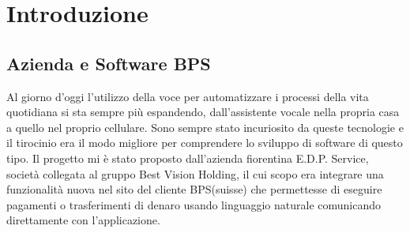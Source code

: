 \chapter{Introduzione}
\section{Azienda e Software BPS}
Al giorno d'oggi l'utilizzo della voce per automatizzare i processi della vita quotidiana si sta sempre più espandendo, dall'assistente vocale nella propria casa a quello nel proprio cellulare. Sono sempre stato incuriosito da queste tecnologie e il tirocinio era il modo migliore per comprendere lo sviluppo di software di questo tipo. Il progetto mi è stato proposto dall'azienda fiorentina E.D.P. Service, società collegata al gruppo Best Vision Holding, il cui scopo era integrare una funzionalità nuova nel sito del cliente BPS(suisse) che permettesse di eseguire pagamenti o trasferimenti di denaro usando linguaggio naturale comunicando direttamente con l'applicazione.

